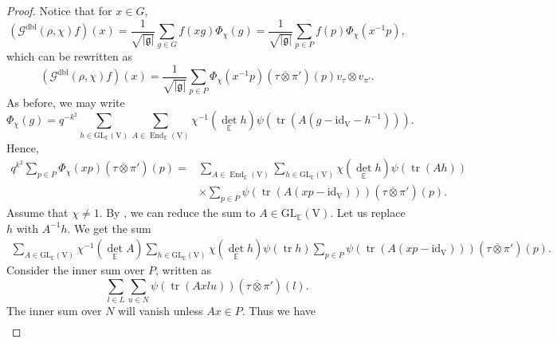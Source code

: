 \documentclass[12pt, reqno]{amsart}
\theoremstyle{definition}
\theoremstyle{definition}
\theoremstyle{definition}
\newcommand{\detQuadratic}{{\det}_{\quadraticExtension}}
\newcommand{\EndomorphismRing}{\operatorname{End}}
\newcommand{\idmap}{\mathrm{id}}
\newcommand{\sizeof}[1]{\left|#1\right|}
\newcommand{\hermitianSpace}{\mathrm{V}}
\newcommand{\fieldCharacter}{\psi}
\newcommand{\trace}{\operatorname{tr}}
\newcommand{\GL}{\mathrm{GL}}
\newcommand{\quadraticExtension}{\mathbb{E}}
\newcommand{\dblGaussSum}[2]{\mathcal{G}^{\mathrm{dbl}}\left(#1, #2\right)}
\newcommand{\lieAlgebra}{\mathfrak{g}}
\begin{document}
\begin{proof}
	Notice that for $x \in G$, $$\left(\dblGaussSum{\rho}{\chi} f\right)\left(x\right) = \frac{1}{\sqrt{\sizeof{\lieAlgebra}}} \sum_{g \in G} f\left(xg\right) \Phi_{\chi}\left(g\right) = \frac{1}{\sqrt{\sizeof{\lieAlgebra}}} \sum_{p \in P} f\left(p\right) \Phi_{\chi}\left(x^{-1} p\right),$$
	which can be rewritten as
	$$\left(\dblGaussSum{\rho}{\chi} f\right)\left(x\right) = \frac{1}{\sqrt{\sizeof{\lieAlgebra}}} \sum_{p \in P}  \Phi_{\chi}\left(x^{-1} p\right) \left(\tau \overline{\otimes} \pi'\right)\left(p\right) v_\tau \otimes v_{\pi'}.$$
	As before, we may write
	$$\Phi_{\chi}\left(g\right) = q^{-k^2} \sum_{h \in \GL_{\quadraticExtension}\left(\hermitianSpace\right)} \sum_{A \in \EndomorphismRing_{\quadraticExtension}\left(\hermitianSpace\right)} \chi^{-1}\left(\detQuadratic h\right) \fieldCharacter\left(\trace\left(A \left(g - \idmap_{\hermitianSpace} - h^{-1}\right)\right)\right).$$
	Hence, \begin{align*}
		q^{k^2} \sum_{p \in P} \Phi_{\chi}\left(xp\right) \left(\tau \overline{\otimes} \pi'\right)\left(p\right) =& \sum_{A \in \EndomorphismRing_{\quadraticExtension}\left(\hermitianSpace\right)} \sum_{h \in \GL_{\quadraticExtension}\left(\hermitianSpace\right)} \chi\left(\detQuadratic h\right)\fieldCharacter\left(\trace\left(Ah\right)\right) \\
		& \times \sum_{p \in P} \fieldCharacter\left(\trace\left(A \left(xp - \idmap_{\hermitianSpace}\right)\right)\right) \left(\tau \overline{\otimes} \pi'\right)\left(p\right).
	\end{align*}
	Assume that $\chi \ne 1$. By , we can reduce the sum to $A \in \GL_{\quadraticExtension}\left(\hermitianSpace\right)$. Let us replace $h$ with $A^{-1} h$. We get the sum
	\begin{align*}
		\sum_{A \in \GL_{\quadraticExtension}\left(\hermitianSpace\right)} \chi^{-1}\left(\detQuadratic A\right) \sum_{h \in \GL_{\quadraticExtension}\left(\hermitianSpace\right)} \chi\left(\detQuadratic h\right)\fieldCharacter\left(\trace h\right) \sum_{p \in P} \fieldCharacter\left(\trace\left(A \left(xp - \idmap_{\hermitianSpace}\right)\right)\right) \left(\tau \overline{\otimes} \pi'\right)\left(p\right).
	\end{align*}
	Consider the inner sum over $P$, written as $$\sum_{l \in L} \sum_{u \in N} \fieldCharacter\left(\trace\left(A x l u\right)\right) \left(\tau \overline{\otimes} \pi'\right)\left(l\right).$$
	The inner sum over $N$ will vanish unless $Ax \in P$. Thus we have
	\begin{align*}

\end{align*}
\end{proof}
\end{document}
